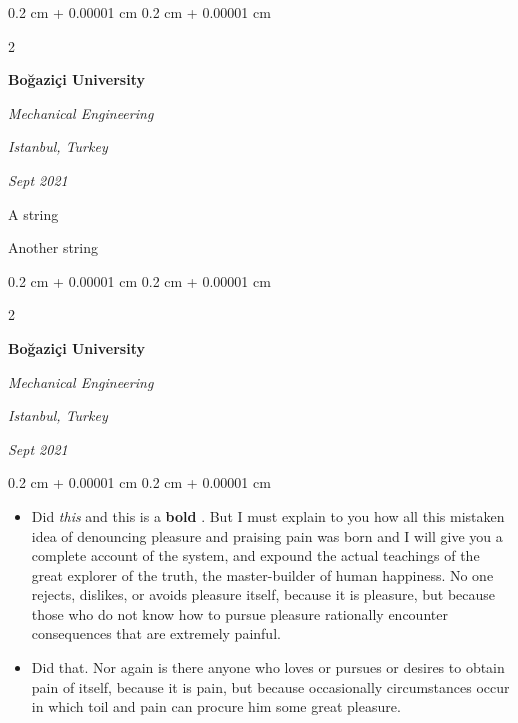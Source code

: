 \documentclass[10pt, letterpaper]{article}
\newenvironment{summary}{
    \begin{description}[
        topsep=0.10 cm,
        parsep=0.10 cm,
        partopsep=0pt,
        itemsep=0pt,
        leftmargin=0.4 cm + 10pt
    ]
}{
    \end{description}
} %
\newenvironment{highlights}{
    \begin{itemize}[
        topsep=0.10 cm,
        parsep=0.10 cm,
        partopsep=0pt,
        itemsep=0pt,
        leftmargin=0.4 cm + 10pt
    ]
}{
    \end{itemize}
} %
\newenvironment{onecolentry}{
    \begin{adjustwidth}{
        0.2 cm + 0.00001 cm
    }{
        0.2 cm + 0.00001 cm
    }
}{
    \end{adjustwidth}
} %
\newenvironment{twocolentry}[2][]{
    \onecolentry
    \def\secondColumn{#2}
    \setcolumnwidth{\fill, 4.5 cm}
    \begin{paracol}{2}
}{
    \switchcolumn \raggedleft \secondColumn
    \end{paracol}
    \endonecolentry
} %
\let\hrefWithoutArrow\href
\renewcommand{\href}[2]{\hrefWithoutArrow{#1}{\ifthenelse{\equal{#2}{}}{ }{#2 }\raisebox{.15ex}{\footnotesize \faExternalLink*}}}
\begin{document}
        \vspace{0.2 cm}

        \begin{twocolentry}{
        \textit{Istanbul, Turkey}    
            
        \textit{Sept 2021}}
            \textbf{Boğaziçi University}

            \textit{Mechanical Engineering}
        \end{twocolentry}
            \begin{summary}
                \item A string
                \item Another string
            \end{summary}


        \vspace{0.2 cm}

        \begin{twocolentry}{
        \textit{Istanbul, Turkey}    
            
        \textit{Sept 2021}}
            \textbf{Boğaziçi University}

            \textit{Mechanical Engineering}
        \end{twocolentry}
        \vspace{0.10 cm}
        \begin{onecolentry}
            \begin{highlights}
                \item Did \textit{this} and this is a \textbf{bold} \href{https://example.com}{link}. But I must explain to you how all this mistaken idea of denouncing pleasure and praising pain was born and I will give you a complete account of the system, and expound the actual teachings of the great explorer of the truth, the master-builder of human happiness. No one rejects, dislikes, or avoids pleasure itself, because it is pleasure, but because those who do not know how to pursue pleasure rationally encounter consequences that are extremely painful.
                \item Did that. Nor again is there anyone who loves or pursues or desires to obtain pain of itself, because it is pain, but because occasionally circumstances occur in which toil and pain can procure him some great pleasure.
            \end{highlights}
        \end{onecolentry}


        \vspace{0.2 cm}
\end{document}
